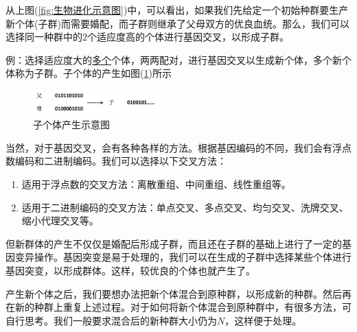             \noindent 从上图(\ref{fig:生物进化示意图})中，可以看出，如果我们先给定一个初始种群要生产新个体(子群)而需要婚配，而子群则继承了父母双方的优良血统。那么，我们可以选择同一种群中的2个适应度高的个体进行基因交叉，以形成子群。
            \par
            例：选择适应度大的\underline{多个}个体，两两配对，进行基因交叉以生成新个体，多个新个体称为子群。子个体的产生如图(\ref{fig:子个体产生示意图})所示
        \begin{figure}[H]
        \centering
        \includegraphics[width=5cm]{images/Sub_individual.jpg}
        \caption{子个体产生示意图}
        \label{fig:子个体产生示意图}
        \end{figure}
            \par
            当然，对于基因交叉，会有各种各样的方法。根据基因编码的不同，我们会有浮点数编码和二进制编码。我们可以选择以下交叉方法：
            \begin{enumerate}
            \item 适用于浮点数的交叉方法：离散重组、中间重组、线性重组等。
            \item 适用于二进制编码的交叉方法：单点交叉、多点交叉、均匀交叉、洗牌交叉、缩小代理交叉等。
            \end{enumerate}
            \par
            但新群体的产生不仅仅是婚配后形成子群，而且还在子群的基础上进行了一定的基因变异操作。基因突变是易于处理的，我们可以在生成的子群中选择某些个体进行基因突变，以形成群体。这样，较优良的个体也就产生了。
            \par
            产生新个体之后，我们要想办法把新个体混合到原种群，以形成新的种群。然后再在新的种群上重复上述过程。对于如何将新个体混合到原种群中，有很多方法，可自行思考。我们一般要求混合后的新种群大小仍为$N$，这样便于处理。
